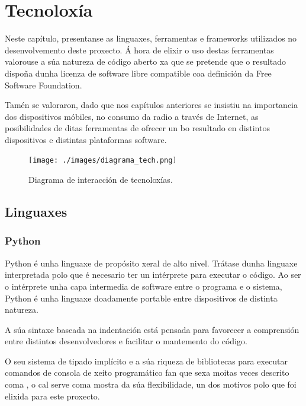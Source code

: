 \chapter[Tecnoloxías Utilizadas]{
  \label{chp:tecnologia}
  Tecnoloxía
}
\minitoc
\newpage

Neste capítulo, presentanse as linguaxes, ferramentas e frameworks utilizados no desenvolvemento deste proxecto. Á hora de elixir o uso destas ferramentas valorouse a súa natureza de código aberto xa que se pretende que o resultado dispoña dunha licenza de software libre compatible coa definición da Free Software Foundation. 

Tamén se valoraron, dado que nos capítulos anteriores se insistiu na importancia dos dispositivos móbiles, no consumo da radio a través de Internet, as posibilidades de ditas ferramentas de ofrecer un bo resultado en distintos dispositivos e distintas plataformas software. 


\begin{figure}[H]
	\centering
	\texttt{[image: ./images/diagrama\_tech.png]}
	\caption{Diagrama de interacción de tecnoloxías.}
	\label{fig:img_diagrama_tech}
\end{figure}


\section{Linguaxes}

\subsection{Python}
\label{python}
Python é unha linguaxe de propósito xeral de alto nivel. Trátase dunha linguaxe interpretada polo que é necesario 
ter un intérprete para executar o código. Ao ser o intérprete unha capa intermedia de software entre o programa
e o sistema, Python é unha linguaxe doadamente portable entre dispositivos de distinta natureza.

A súa sintaxe baseada na indentación está pensada para favorecer a comprensión entre distintos desenvolvedores e 
facilitar o mantemento do código. 

O seu sistema de tipado implícito e a súa riqueza de bibliotecas para executar comandos de consola de xeito programático
fan que sexa moitas veces descrito coma \cite{python1}, o cal serve coma 
mostra da súa flexibilidade, un dos motivos polo que foi elixida para este proxecto.

